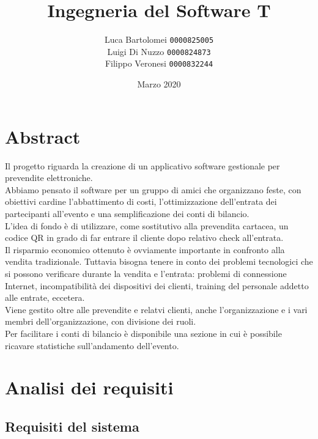 \documentclass[a4paper]{article}
\title{Ingegneria del Software T}
\author{
    Luca Bartolomei 
    \texttt{0000825005}
    \\
    Luigi Di Nuzzo
    \texttt{0000824873}
    \\
    Filippo Veronesi
    \texttt{0000832244}
}
\date{Marzo 2020}
\begin{document}
\maketitle

\tableofcontents

\newpage

\section{Abstract}

Il progetto riguarda la creazione di un applicativo software gestionale per prevendite elettroniche.\\
Abbiamo pensato il software per un gruppo di amici che organizzano feste, con obiettivi cardine l'abbattimento di costi, l'ottimizzazione dell'entrata dei partecipanti all'evento e una semplificazione dei conti di bilancio.\\
L'idea di fondo è di utilizzare, come sostitutivo alla prevendita cartacea, un codice QR in grado di far entrare il cliente dopo relativo check all'entrata.\\
Il risparmio economico ottenuto è ovviamente importante in confronto alla vendita tradizionale. Tuttavia bisogna tenere in conto dei problemi tecnologici che si possono verificare durante la vendita e l'entrata: problemi di connessione Internet, incompatibilità dei dispositivi dei clienti, training del personale addetto alle entrate, eccetera.\\
Viene gestito oltre alle prevendite e relatvi clienti, anche l'organizzazione e i vari membri dell'organizzazione, con divisione dei ruoli.\\
Per facilitare i conti di bilancio è disponibile una sezione in cui è possibile ricavare statistiche sull'andamento dell'evento.

\section{Analisi dei requisiti}

\subsection{Requisiti del sistema}
\end{document}
